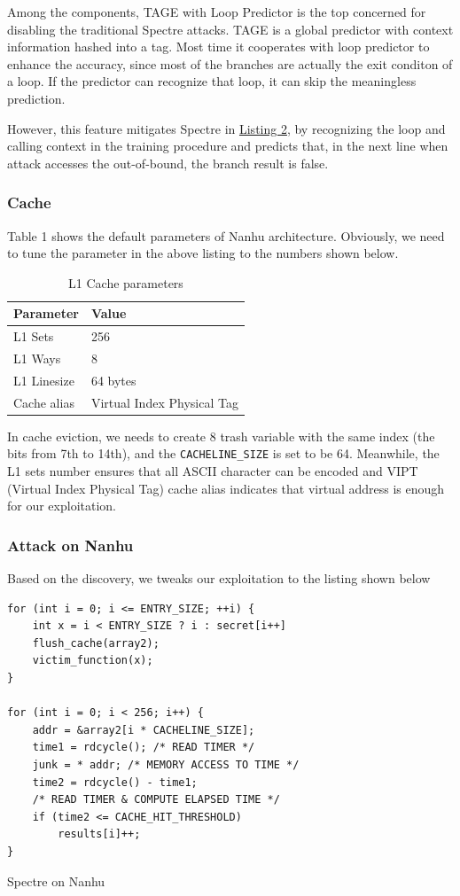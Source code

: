 Among the components, TAGE with Loop Predictor is the top concerned for disabling the traditional Spectre attacks. TAGE is a global predictor with
context information hashed into a tag. Most time it cooperates with loop predictor to enhance the accuracy, since most of the branches are actually the exit conditon of a loop. If the predictor can recognize that loop, it can skip the meaningless prediction.

However, this feature mitigates Spectre in \href{listing:training-bp}{Listing 2}, by recognizing the loop and calling context in the training procedure and predicts that, in the next line when attack accesses the out-of-bound, the branch result is false.

\subsubsection{Cache}
Table 1 shows the default parameters of Nanhu architecture. Obviously, we need to tune the parameter in the above listing to the numbers shown below.

\begin{table}[!htbp]
	\centering
	\begin{tabular}[c]{ll}
		\toprule
        Parameter & Value \\
		\midrule
        L1 Sets & 256 \\
        L1 Ways & 8 \\
        L1 Linesize & 64 bytes \\
        Cache alias & Virtual Index Physical Tag \\
		\bottomrule
	\end{tabular}
    \caption{L1 Cache parameters}
\end{table}

In cache eviction, we needs to create 8 trash variable with the same index (the bits from 7th to 14th), and the \verb|CACHELINE_SIZE| is set to be 64. Meanwhile, the L1 sets number ensures that all ASCII character can be encoded and VIPT (Virtual Index Physical Tag) cache alias indicates that virtual address is enough for our exploitation.

\subsubsection{Attack on Nanhu}
Based on the discovery, we tweaks our exploitation to the listing shown below

\begin{listing}[!h]
\begin{verbatim}
for (int i = 0; i <= ENTRY_SIZE; ++i) {
    int x = i < ENTRY_SIZE ? i : secret[i++]
    flush_cache(array2);
    victim_function(x);
}

for (int i = 0; i < 256; i++) {
    addr = &array2[i * CACHELINE_SIZE];
    time1 = rdcycle(); /* READ TIMER */
    junk = * addr; /* MEMORY ACCESS TO TIME */
    time2 = rdcycle() - time1; 
    /* READ TIMER & COMPUTE ELAPSED TIME */
    if (time2 <= CACHE_HIT_THRESHOLD)
        results[i]++;
}
\end{verbatim}
\label{listing:spectre-nanhu}
\caption{Spectre on Nanhu}
\end{listing}

